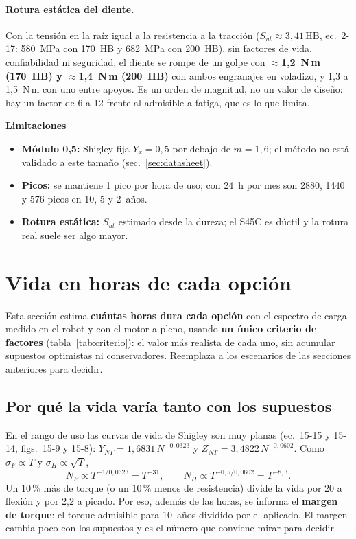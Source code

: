 \documentclass[11pt,a4paper]{article}
\begin{document}
\paragraph{Rotura estática del diente.} Con la tensión en la raíz igual a la resistencia a la tracción
($S_{ut}\approx3{,}41\,\text{HB}$, ec.~2-17: 580~MPa con 170~HB y 682~MPa con 200~HB), sin factores de vida, confiabilidad
ni seguridad, el diente se rompe de un golpe con \textbf{$\approx$1,2~N\,m (170~HB) y $\approx$1,4~N\,m (200~HB)}
con ambos engranajes en voladizo, y 1,3 a 1,5~N\,m con uno entre apoyos. Es un orden de magnitud, no un valor de diseño:
hay un factor de 6 a 12 frente al admisible a fatiga, que es lo que limita.

\textbf{Limitaciones}
\begin{itemize}
  \item \textbf{Módulo 0,5:} Shigley fija $Y_x=0{,}5$ por debajo de $m=1{,}6$; el método no está validado a este tamaño (sec.~\ref{sec:datasheet}).
  \item \textbf{Picos:} se mantiene 1 pico por hora de uso; con 24~h por mes son 2880, 1440 y 576 picos en 10, 5 y 2~años.
  \item \textbf{Rotura estática:} $S_{ut}$ estimado desde la dureza; el S45C es dúctil y la rotura real suele ser algo mayor.
\end{itemize}

\section{Vida en horas de cada opción}\label{sec:vida}
Esta sección estima \textbf{cuántas horas dura cada opción} con el espectro de carga medido en el robot y con el motor
a pleno, usando \textbf{un único criterio de factores} (tabla~\ref{tab:criterio}): el valor más realista de cada uno, sin acumular supuestos
optimistas ni conservadores. Reemplaza a los escenarios de las secciones anteriores para decidir.

\subsection{Por qué la vida varía tanto con los supuestos}
En el rango de uso las curvas de vida de Shigley son muy planas (ec.~15-15 y 15-14, figs.~15-9 y 15-8):
$Y_{NT}=1{,}6831\,N^{-0{,}0323}$ y $Z_{NT}=3{,}4822\,N^{-0{,}0602}$. Como $\sigma_F\propto T$ y $\sigma_H\propto\sqrt{T}$,
\begin{equation}
N_F\propto T^{-1/0{,}0323}=T^{-31}, \qquad N_H\propto T^{-0{,}5/0{,}0602}=T^{-8{,}3}.
\end{equation}
Un 10\,\% más de torque (o un 10\,\% menos de resistencia) divide la vida por 20 a flexión y por 2,2 a picado.
Por eso, además de las horas, se informa el \textbf{margen de torque}: el torque admisible para 10~años dividido por el
aplicado. El margen cambia poco con los supuestos y es el número que conviene mirar para decidir.
\end{document}
